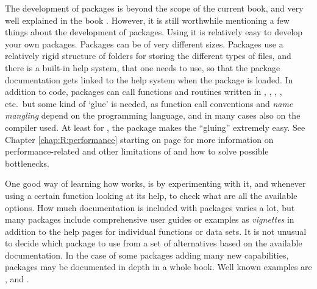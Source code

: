 \documentclass[krantz2]{krantz}\usepackage{knitr}%
\begin{document}
The development of packages is beyond the scope of the current book, and very well explained in the book  \autocite{Wickham2015}. However, it is still worthwhile mentioning a few things about the development of \Rpgrm packages. Using \RStudio it is relatively easy to develop your own packages. Packages can be of very different sizes. Packages use a relatively rigid structure of folders for storing the different types of files, and there is a built-in help system, that one needs to use, so that the package documentation gets linked to the \Rlang help system when the package is loaded. In addition to \Rlang code, packages can call functions and routines written in , , , , etc.\ but some kind of `glue' is needed, as function call conventions and \emph{name mangling} depend on the programming language, and in many cases also on the compiler used. At least for , the   package makes the ``gluing'' extremely easy. See Chapter \ref{chap:R:performance} starting on page \pageref{chap:R:performance} for more information on performance-related and other limitations of  and how to solve possible bottlenecks.

One good way of learning how \Rlang works, is by experimenting with it, and whenever using a certain function looking at its help, to check what are all the available options. How much documentation is included with packages varies a lot, but many packages include comprehensive user guides or examples as \emph{vignettes} in addition to the help pages for individual functions or data sets. It is not unusual to decide which package to use from a set of alternatives based on the available documentation. In the case of some packages adding many new capabilities, packages may be documented in depth in a whole book. Well known examples are  \autocite{Pinheiro2000},  \autocite{Sarkar2008} and  \autocite{Wickham2016}.
\end{document}
